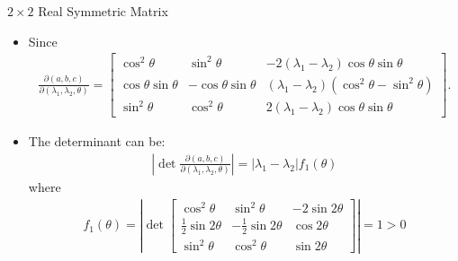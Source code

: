 \documentclass[UTF8,AutoFakeBold,AutoFakeSlant]{beamer}
\begin{document}
\begin{frame}{$2\times 2$ Real Symmetric Matrix}
    \begin{itemize}
        \scriptsize
        \item Since
              \begin{align*}
                  \frac{\partial(a,b,c)}{\partial(\lambda_1,\lambda_2,\theta)}=\begin{bmatrix}\cos^2\theta&\sin^2\theta&-2(\lambda_1-\lambda_2)\cos\theta\sin\theta\\\cos\theta\sin\theta&-\cos\theta\sin\theta&(\lambda_1-\lambda_2)(\cos^2\theta-\sin^2\theta)\\\sin^2\theta&\cos^2\theta&2(\lambda_1-\lambda_2)\cos\theta\sin\theta\end{bmatrix}.
              \end{align*}
        \item The determinant can be:
              \begin{align*}
                  \left|\det\frac{\partial(a,b,c)}{\partial(\lambda_1,\lambda_2,\theta)}\right|=|\lambda_1-\lambda_2|f_1(\theta)
              \end{align*}
              where
              \begin{align*}
                  \left.f_1(\theta)=\left|\det\begin{bmatrix}\cos^2\theta&\sin^2\theta&-2\sin2\theta\\\frac12\sin2\theta&-\frac12\sin2\theta&\cos2\theta\\\sin^2\theta&\cos^2\theta&\sin2\theta\end{bmatrix}\right.\right|=1>0
              \end{align*}
    \end{itemize}
\end{frame}
\end{document}
